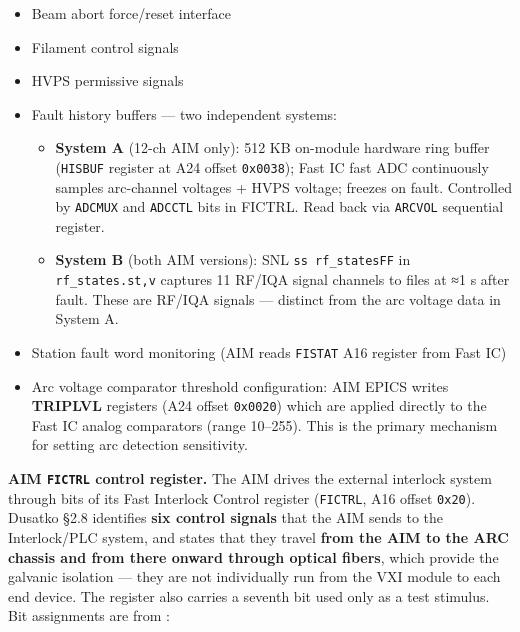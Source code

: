 \begin{itemize}
\tightlist
\item
  Beam abort force/reset interface
\item
  Filament control signals
\item
  HVPS permissive signals
\item
  Fault history buffers --- two independent systems:

  \begin{itemize}
  \tightlist
  \item
    \textbf{System A} (12-ch AIM only): 512 KB on-module hardware ring buffer (\texttt{HISBUF} register at A24 offset \texttt{0x0038}); Fast IC fast ADC continuously samples arc-channel voltages + HVPS voltage; freezes on fault. Controlled by \texttt{ADCMUX} and \texttt{ADCCTL} bits in FICTRL. Read back via \texttt{ARCVOL} sequential register.
  \item
    \textbf{System B} (both AIM versions): SNL \texttt{ss\ rf\_statesFF} in \texttt{rf\_states.st,v} captures 11 RF/IQA signal channels to  files at ≈1 s after fault. These are RF/IQA signals --- distinct from the arc voltage data in System A.
  \end{itemize}
\item
  Station fault word monitoring (AIM reads \texttt{FISTAT} A16 register from Fast IC)
\item
  Arc voltage comparator threshold configuration: AIM EPICS writes \textbf{TRIPLVL} registers (A24 offset \texttt{0x0020}) which are applied directly to the Fast IC analog comparators (range 10--255). This is the primary mechanism for setting arc detection sensitivity.
\end{itemize}

\textbf{AIM \texttt{FICTRL} control register.} The AIM drives the external interlock system through bits of its Fast Interlock Control register (\texttt{FICTRL}, A16 offset \texttt{0x20}). Dusatko  §2.8 identifies \textbf{six control signals} that the AIM sends to the Interlock/PLC system, and states that they travel \textbf{from the AIM to the ARC chassis and from there onward through optical fibers}, which provide the galvanic isolation --- they are not individually run from the VXI module to each end device. The register also carries a seventh bit used only as a test stimulus. Bit assignments are from :

